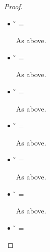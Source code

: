 \begin{lemma}
\begin{proof}
\begin{case}[T-App]
\begin{itemize}
\begin{subcase}[B-Delta]
\begin{itemize}
\begin{subcase}[\const{} = \classconst]
\begin{itemize}
\begin{subcase}[\v{2} = \classvalue{\class{}} {\overrightarrow {\classfieldpair{\fld{i}} {\v{i}}}}]
                    Part 2 is trivial since both propositions are \topprop{} by substitution.
                    
                    Part 3 holds because {}.
                  \end{subcase}
          \item[] \begin{subcase}[\v{2} = \class{}] \v{} = \Class{}

              As above.
                  \end{subcase}
          \item[] \begin{subcase}[\v{2} = \true{}] \v{} = \Boolean{}

              As above.
                  \end{subcase}
          \item[] \begin{subcase}[\v{2} = \false{}] \v{} = \Boolean{}


              As above.
                  \end{subcase}
          \item[] \begin{subcase}[\v{2} = {\closure {\openv{}} {\abs {\x{}} {\t{}} {\e{}}}}] \v{} = \IFn{}


              As above.
                  \end{subcase}
          \item[] \begin{subcase}[\v{2} = {\multi {\v{d}} {\disptable{}}}] \v{} = \HMapInstance{}


              As above.
                  \end{subcase}
          \item[] \begin{subcase}[\v{2} = {\curlymapvaloverright{\v{1}}{\v{2}}}] \v{} = \Keyword{}


              As above.
                  \end{subcase}
          \item[] \begin{subcase}[\v{2} = {\nil{}}] \v{} = \nil{}


\end{subcase}
\end{itemize}
\end{subcase}
\end{itemize}
\end{subcase}
\end{itemize}
\end{case}
\end{proof}
\end{lemma}
